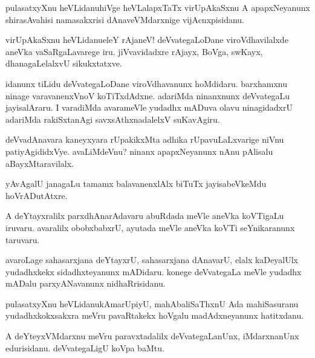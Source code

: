 \begin{mng}
pulasatxyXnu heVLidanu\mdash hiVge heVLalapxTaTx virUpAkaSxnu A apapxNeyanunx shirasAvahisi namasakxrisi dAnaveVMdarxnige vijAcnxpisidanu.
\end{mng}

\begin{mng}
virUpAkaSxnu heVLidanu\mdash eleY rAjaneV! deVvategaLoDane viroVdhavilalxde aneVka vaSaRgaLavarege iru. jiVvavidadxre rAjayx, BoVga, swKayx, dhanagaLelalxvU sikukxtatxve.
\end{mng}

\begin{mng}
idanunx tiLidu deVvategaLoDane viroVdhavanunx hoMdidaru. barxhamxnu ninage varavanenxVnoV koTiTxdAdxne. adariMda ninanxnunx deVvategaLu jayisalAraru. I varadiMda avarameVle yudadhx mADuva olavu ninagidadxrU adariMda rakiSxtanAgi savxsAthxnadalelxV suKavAgiru.
\end{mng}

\begin{mng}
deVvadAnavara kaneyxyara rUpakikxMta adhika rUpavuLaLxvarige niVnu patiyAgididxVye. avaLiMdeVnu? ninanx apapxNeyanunx nAnu pAlisalu aBayxMtaravilalx.
\end{mng}

\begin{mng}
yAvAgalU janagaLu tamamx balavanenxlAlx biTuTx jayisabeVkeMdu hoVrADutAtxre.
\end{mng}

\begin{mng}
A deYtayxralilx parxdhAnarAdavaru abuRdada meVle aneVka koVTigaLu iruvaru. avaralilx obobxbabxrU, ayutada meVle aneVka koVTi seYnikaranunx taruvaru.
\end{mng}

\begin{mng}
avaroLage sahasarxjana deYtayxrU, sahasarxjana dAnavarU, elalx kaDeyalUlx yudadhxkekx sidadhxteyanunx mADidaru. konege deVvategaLa meVle yudadhx mADalu parxyANavanunx nidhaRrisidanu.
\end{mng}

\begin{mng}
pulasatxyXnu heVLidanu\mdash kAmarUpiyU, mahAbaliSaThxnU Ada mahiSasuranu yudadhxkokxsakxra meVru pavaRtakekx hoVgalu madAdxneyanunx hatitxdanu.
\end{mng}

\begin{mng}
A deYteyxVMdarxnu meVru paravxtadalilx deVvategaLanUnx, iMdarxnanUnx edurisidanu. deVvategaLigU koVpa baMtu.
\end{mng}

